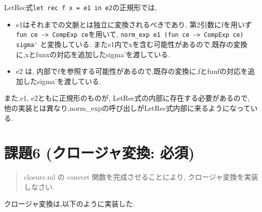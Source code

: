 LetRec式\lstinline{let rec f x = e1 in e2}の正規形では, 

\begin{itemize}

\item e1はそれまでの文脈とは独立に変換されるべきであり, 第2引数にfを用いず\lstinline{fun ce -> CompExp ce}を用いて,
\lstinline{norm_exp e1 (fun ce -> CompExp ce) sigma'} と変換している.  またe1内でxを含む可能性があるので,既存の変換に,xとfunxの対応を追加したsigma'を渡している.

\item e2 は, 内部でfを参照する可能性があるので,既存の変換に,fとfunfの対応を追加したsigma'を渡している.

\end{itemize}

また,e1, e2ともに正規形のものが, LetRec式の内部に存在する必要があるので, 他の実装とは異なり,norm\_expの呼び出しがLetRec式内部に来るようになっている.

\section*{課題6 (クロージャ変換: 必須)}

\begin{quotation}
closure.ml の convert 関数を完成させることにより, クロージャ変換を実装しなさい.
\end{quotation}

クロージャ変換は,以下のように実装した.

